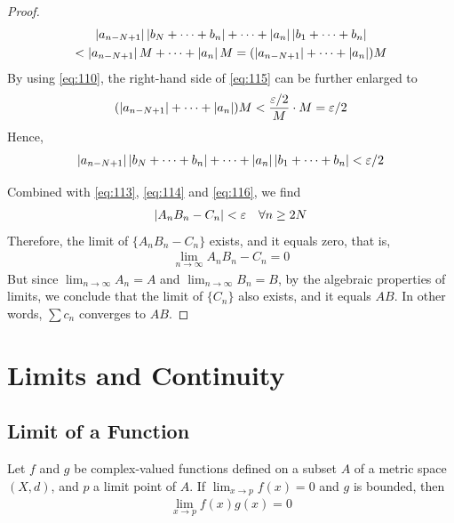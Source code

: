 \documentclass[thmcnt=section, 12pt]{my-elegantbook}
\begin{document}
\begin{proof}
\begin{multline}
        \left\lvert a_{n-N+1} \right\rvert \left\lvert b_{N} + \cdots + b_n \right\rvert
        + \cdots
        + \left\lvert a_n \right\rvert \left\lvert b_{1} + \cdots + b_n \right\rvert \\
        < \left\lvert a_{n-N+1} \right\rvert M
        + \cdots
        + \left\lvert a_n \right\rvert M
        = (\left\lvert a_{n-N+1} \right\rvert + \cdots + \left\lvert a_n \right\rvert) M
        \label{eq:115}
    \end{multline}
    By using \eqref{eq:110}, the right-hand side of \eqref{eq:115} can be further enlarged to
    \begin{align*}
        (\left\lvert a_{n-N+1} \right\rvert + \cdots + \left\lvert a_n \right\rvert) M
        < \frac{\varepsilon / 2}{M}
        \cdot M
        = \varepsilon / 2
    \end{align*}
    Hence,
    \begin{align}
        \left\lvert a_{n-N+1} \right\rvert \left\lvert b_{N} + \cdots + b_n \right\rvert
        + \cdots
        + \left\lvert a_n \right\rvert \left\lvert b_{1} + \cdots + b_n \right\rvert
        < \varepsilon / 2
        \label{eq:116}
    \end{align}

    Combined with \eqref{eq:113}, \eqref{eq:114} and \eqref{eq:116}, we find
    \begin{align*}
        \left\lvert A_n B_n - C_n \right\rvert < \varepsilon
        \quad
        \forall n \geq 2N
    \end{align*}
    Therefore, the limit of $\{ A_n B_n - C_n \}$ exists, and it equals zero, that is,
    \begin{align*}
        \lim_{n \to \infty} A_n B_n - C_n = 0
    \end{align*}
    But since $\lim_{n \to \infty} A_n = A$ and $\lim_{n \to \infty} B_n = B$, by the algebraic properties of limits, we conclude that the limit of $\{C_n\}$ also exists, and it equals $AB$. In other words, $\sum c_n$ converges to $AB$.
\end{proof}


\chapter{Limits and Continuity}


\section{Limit of a Function}

\begin{proposition} \label{pro:2}
    Let $f$ and $g$ be complex-valued functions defined on a subset $A$ of a metric space $(X, d)$, and $p$ a limit point of $A$. If $\lim_{x \to p} f(x) = 0$ and $g$ is bounded, then
    \begin{align*}
        \lim_{x \to p} f(x)g(x) = 0
    \end{align*}
\end{proposition}
\end{document}
